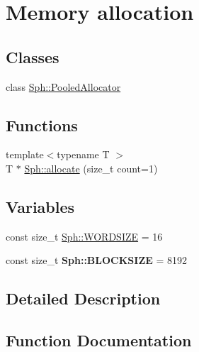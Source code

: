 \hypertarget{group__memalloc__grp}{}\section{Memory allocation}
\label{group__memalloc__grp}
\subsection*{Classes}
\begin{DoxyCompactItemize}
\item 
class \hyperlink{classSph_1_1PooledAllocator}{Sph\+::\+Pooled\+Allocator}
\end{DoxyCompactItemize}
\subsection*{Functions}
\begin{DoxyCompactItemize}
\item 
{\footnotesize template$<$typename T $>$ }\\T $\ast$ \hyperlink{group__memalloc__grp_ga7d97b7870fd2abadbc5a51c58d64f843}{Sph\+::allocate} (size\+\_\+t count=1)
\end{DoxyCompactItemize}
\subsection*{Variables}
\begin{DoxyCompactItemize}
\item 
const size\+\_\+t \hyperlink{group__memalloc__grp_ga72b23d35004c0a869d61d4848bdc3bc8}{Sph\+::\+W\+O\+R\+D\+S\+I\+ZE} = 16
\item 
\hypertarget{group__memalloc__grp_ga30284af163a8424d6c2c4b94bef6726c}{}\label{group__memalloc__grp_ga30284af163a8424d6c2c4b94bef6726c} 
const size\+\_\+t {\bfseries Sph\+::\+B\+L\+O\+C\+K\+S\+I\+ZE} = 8192
\end{DoxyCompactItemize}


\subsection{Detailed Description}


\subsection{Function Documentation}
\hypertarget{group__memalloc__grp_ga7d97b7870fd2abadbc5a51c58d64f843}{}\label{group__memalloc__grp_ga7d97b7870fd2abadbc5a51c58d64f843} 
